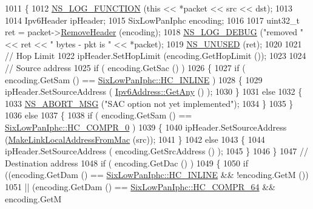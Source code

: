 \begin{DoxyCode}
1011 \{
1012   \hyperlink{log-macros-disabled_8h_a90b90d5bad1f39cb1b64923ea94c0761}{NS\_LOG\_FUNCTION} (\textcolor{keyword}{this} << *packet << src << dst);
1013 
1014   Ipv6Header ipHeader;
1015   SixLowPanIphc encoding;
1016 
1017   uint32\_t ret = packet->\hyperlink{classns3_1_1Packet_a0961eccf975d75f902d40956c93ba63e}{RemoveHeader} (encoding);
1018   \hyperlink{group__logging_ga413f1886406d49f59a6a0a89b77b4d0a}{NS\_LOG\_DEBUG} (\textcolor{stringliteral}{"removed "} << ret << \textcolor{stringliteral}{" bytes - pkt is "} << *packet);
1019   \hyperlink{unused_8h_a3ba03ad859378e9f01285afb60f0e3ab}{NS\_UNUSED} (ret);
1020 
1021   \textcolor{comment}{// Hop Limit}
1022   ipHeader.SetHopLimit (encoding.GetHopLimit ());
1023 
1024   \textcolor{comment}{// Source address}
1025   \textcolor{keywordflow}{if} ( encoding.GetSac () )
1026     \{
1027       \textcolor{keywordflow}{if} ( encoding.GetSam () == \hyperlink{classns3_1_1SixLowPanIphc_a384e6b68c86e9d9a07c923dbc21a6843a67481ea7303a3a3bcdd03f14630a1e42}{SixLowPanIphc::HC\_INLINE} )
1028         \{
1029           ipHeader.SetSourceAddress ( \hyperlink{classns3_1_1Ipv6Address_a2783e8badfc98c8b0a8508bba6e1b91e}{Ipv6Address::GetAny} () );
1030         \}
1031       \textcolor{keywordflow}{else}
1032         \{
1033           \hyperlink{group__fatal_ga51ac4699be799d772ae7258d1ef6af21}{NS\_ABORT\_MSG} (\textcolor{stringliteral}{"SAC option not yet implemented"});
1034         \}
1035     \}
1036   \textcolor{keywordflow}{else}
1037     \{
1038       \textcolor{keywordflow}{if} ( encoding.GetSam () == \hyperlink{classns3_1_1SixLowPanIphc_a384e6b68c86e9d9a07c923dbc21a6843a20c6daaf8cc1cfec17270484cec677c0}{SixLowPanIphc::HC\_COMPR\_0} )
1039         \{
1040           ipHeader.SetSourceAddress (\hyperlink{classns3_1_1SixLowPanNetDevice_acf66b0ff019d0f1b88212d452044696e}{MakeLinkLocalAddressFromMac} (src));
1041         \}
1042       \textcolor{keywordflow}{else}
1043         \{
1044           ipHeader.SetSourceAddress ( encoding.GetSrcAddress () );
1045         \}
1046     \}
1047   \textcolor{comment}{// Destination address}
1048   \textcolor{keywordflow}{if} ( encoding.GetDac () )
1049     \{
1050       \textcolor{keywordflow}{if} ((encoding.GetDam () == \hyperlink{classns3_1_1SixLowPanIphc_a384e6b68c86e9d9a07c923dbc21a6843a67481ea7303a3a3bcdd03f14630a1e42}{SixLowPanIphc::HC\_INLINE}  && !encoding.GetM ())
1051           || (encoding.GetDam () == \hyperlink{classns3_1_1SixLowPanIphc_a384e6b68c86e9d9a07c923dbc21a6843a79b29ccd0370a00b3e182abee52ea59a}{SixLowPanIphc::HC\_COMPR\_64}  && encoding.GetM 

\end{DoxyCode}
